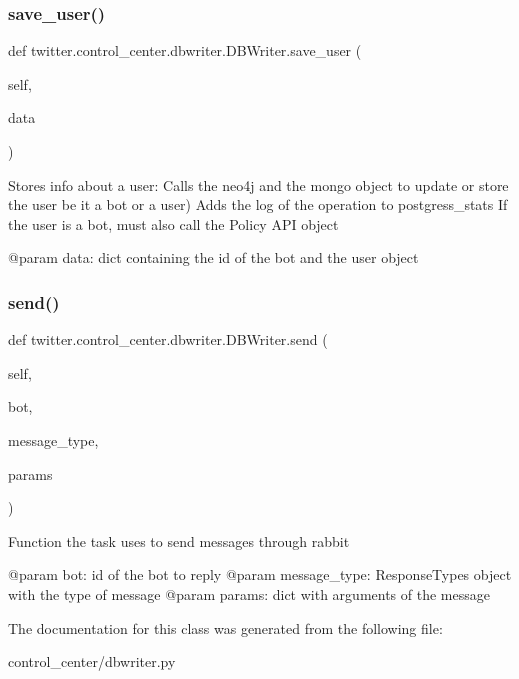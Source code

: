\subsubsection{\texorpdfstring{save\+\_\+user()}{save\_user()}}
{\footnotesize\ttfamily def twitter.\+control\+\_\+center.\+dbwriter.\+D\+B\+Writer.\+save\+\_\+user (\begin{DoxyParamCaption}\item[{}]{self,  }\item[{}]{data }\end{DoxyParamCaption})}

\begin{DoxyVerb}Stores info about a user:
Calls the neo4j and the mongo object to update or store the user be it a bot or a user)
Adds the log of the operation to postgress_stats
If the user is a bot, must also call the Policy API object

@param data: dict containing the id of the bot and the user object
\end{DoxyVerb}
 \mbox{\label{classtwitter_1_1control__center_1_1dbwriter_1_1DBWriter_a3a6e2d36449a7f745d31e328cc4d92d9}} 
\subsubsection{\texorpdfstring{send()}{send()}}
{\footnotesize\ttfamily def twitter.\+control\+\_\+center.\+dbwriter.\+D\+B\+Writer.\+send (\begin{DoxyParamCaption}\item[{}]{self,  }\item[{}]{bot,  }\item[{}]{message\+\_\+type,  }\item[{}]{params }\end{DoxyParamCaption})}

\begin{DoxyVerb}Function the task uses to send messages through rabbit

@param bot: id of the bot to reply
@param message_type: ResponseTypes object with the type of message
@param params: dict with arguments of the message
\end{DoxyVerb}
 

The documentation for this class was generated from the following file\+:\begin{DoxyCompactItemize}
\item 
control\+\_\+center/dbwriter.\+py\end{DoxyCompactItemize}
